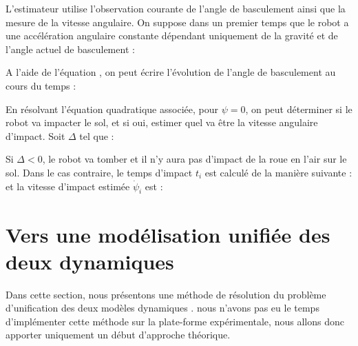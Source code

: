 			L'estimateur utilise l'observation courante de l'angle de basculement ainsi que la mesure de la vitesse angulaire.
			On suppose dans un premier temps que le robot a une accélération angulaire constante dépendant uniquement de la gravité et de l'angle actuel de basculement :
			
			A l'aide de l'équation , on peut écrire l'évolution de l'angle de basculement au cours du temps :
			
			En résolvant l'équation quadratique associée, pour $\psi=0$, on peut déterminer si le robot va impacter le sol, et si oui, estimer quel va être la vitesse angulaire d'impact.
			Soit $\Delta$ tel que :
			
			Si $\Delta<0$, le robot va tomber et il n'y aura pas d'impact de la roue en l'air sur le sol.
			Dans le cas contraire, le temps d'impact $t_i$ est calculé de la manière suivante :
			et la vitesse d'impact estimée $\dot{\psi}_i$ est :

	\section{Vers une modélisation unifiée des deux dynamiques}
	\label{section.modelisation_unifiee}
	
		Dans cette section, nous présentons une méthode de résolution du problème d'unification des deux modèles dynamiques .
		nous n'avons pas eu le temps d'implémenter cette méthode sur la plate-forme expérimentale, nous allons donc apporter uniquement un début d'approche théorique.
		
